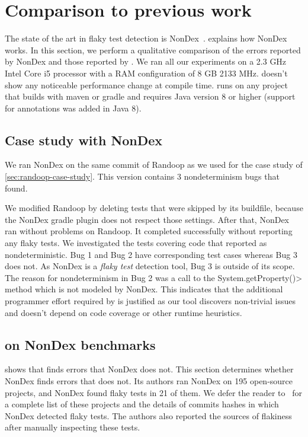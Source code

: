 \section{Comparison to previous work}

The state of the art in flaky test detection is NonDex~\cite{nondex}.
 explains how NonDex works. In this section, we perform a qualitative comparison of the
errors reported by NonDex and those reported by \TheDeterminismChecker. We ran all our
experiments on a 2.3 GHz Intel Core i5 processor with a RAM configuration of 8 GB 2133 MHz.
\TheDeterminismChecker doesn't show any noticeable performance change at compile time.
\TheDeterminismChecker runs on any project that builds with maven or gradle and requires
Java version 8 or higher (support for annotations was added in Java 8).

\subsection{Case study with NonDex}\label{sec:nondex-randoop}

We ran NonDex on the same commit of Randoop as we used for the case study
of \cref{sec:randoop-case-study}.  This version contains 3 nondeterminism bugs that
\theDeterminismChecker found.

We modified Randoop by deleting tests that were skipped by its buildfile,
because the NonDex gradle plugin does not respect those settings. 
After that, NonDex ran without problems on Randoop.
It completed successfully without reporting any flaky tests.
We investigated the tests covering code that \theDeterminismChecker reported as nondeterministic.
Bug 1 and Bug 2 have corresponding test cases whereas Bug 3 does not.
As NonDex is a \textit{flaky test} detection tool, Bug 3 is outside of its scope.
The reason for nondeterminism in Bug 2 was a call to the \<System.getProperty()> method which
is not modeled by NonDex.
This indicates that the additional programmer effort required by \TheDeterminismChecker is justified
as our tool discovers non-trivial issues and doesn't depend on code coverage or other runtime heuristics.

\subsection{\TheDeterminismChecker on NonDex benchmarks}\label{sec:nondex-benchmarks}

 shows that \theDeterminismChecker finds errors that NonDex does not.
This section determines whether NonDex finds errors that \theDeterminismChecker does not.
Its authors ran NonDex on 195 open-source projects, and NonDex found flaky tests in
21 of them. We defer the reader to~\cite{nondex} for a complete list of these projects
and the details of commits hashes in which NonDex detected flaky tests.
The authors also reported the sources of flakiness
after manually inspecting these tests. 


